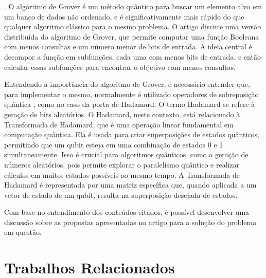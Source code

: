 \documentclass[12pt]{article}
\begin{document}
\cite{grover:96}. O algoritmo de Grover é um método quântico para buscar um elemento alvo em um banco de dados não ordenado, e é significativamente mais rápido do que qualquer algoritmo clássico para o mesmo problema. O artigo discute uma versão distribuída do algoritmo de Grover, que permite computar uma função Booleana com menos consultas e um número menor de bits de entrada. A ideia central é decompor a função em subfunções, cada uma com menos bits de entrada, e então calcular essas subfunções para encontrar o objetivo com menos consultas.

Entendendo a importância do algoritmo de Grover, é necessário entender que, para implementar o mesmo, normalmente é utilizado operadores de sobreposição quântica , como no caso da porta de Hadamard.\cite{silva:18} O termo Hadamard se refere à geração de bits aleatórios. O Hadamard, neste contexto, está relacionado à Transformada de Hadamard, que é uma operação linear fundamental em computação quântica. Ela é usada para criar superposições de estados quânticos, permitindo que um qubit esteja em uma combinação de estados 0 e 1 simultaneamente. Isso é crucial para algoritmos quânticos, como a geração de números aleatórios, pois permite explorar o paralelismo quântico e realizar cálculos em muitos estados possíveis ao mesmo tempo. A Transformada de Hadamard é representada por uma matriz específica que, quando aplicada a um vetor de estado de um qubit, resulta na superposição desejada de estados.

Com base no entendimento dos conteúdos citados, é possível desenvolver uma discussão sobre as propostas apresentadas no artigo para a solução do problema em questão.

\section{Trabalhos Relacionados}
\end{document}
